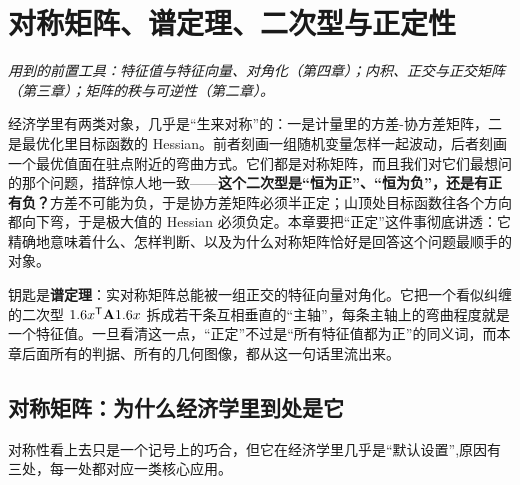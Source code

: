 \chapter{对称矩阵、谱定理、二次型与正定性}
\label{ch:spectral}

\noindent\emph{用到的前置工具：特征值与特征向量、对角化（第四章）；内积、正交与正交矩阵（第三章）；矩阵的秩与可逆性（第二章）。}
\medskip

经济学里有两类对象，几乎是``生来对称''的：一是计量里的方差-协方差矩阵，二是最优化里目标函数的 Hessian。前者刻画一组随机变量怎样一起波动，后者刻画一个最优值面在驻点附近的弯曲方式。它们都是对称矩阵，而且我们对它们最想问的那个问题，措辞惊人地一致——\textbf{这个二次型是``恒为正''、``恒为负''，还是有正有负？}方差不可能为负，于是协方差矩阵必须半正定；山顶处目标函数往各个方向都向下弯，于是极大值的 Hessian 必须负定。本章要把``正定''这件事彻底讲透：它精确地意味着什么、怎样判断、以及为什么对称矩阵恰好是回答这个问题最顺手的对象。

钥匙是\textbf{谱定理}：实对称矩阵总能被一组正交的特征向量对角化。它把一个看似纠缠的二次型 $1.6 x^{\mathsf{T}}\mathbf{A}1.6 x$ 拆成若干条互相垂直的``主轴''，每条主轴上的弯曲程度就是一个特征值。一旦看清这一点，``正定''不过是``所有特征值都为正''的同义词，而本章后面所有的判据、所有的几何图像，都从这一句话里流出来。

\section{对称矩阵：为什么经济学里到处是它}
\label{sec:spectral-1}


对称性看上去只是一个记号上的巧合，但它在经济学里几乎是``默认设置'',原因有三处，每一处都对应一类核心应用。


